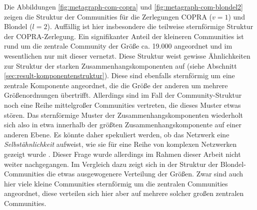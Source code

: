 Die Abbildungen \ref{fig:metagraph-com-copra} und
\ref{fig:metagraph-com-blondel2} zeigen die Struktur der Communities
für die Zerlegungen COPRA ($v=1$) und Blondel ($l=2$). Auffällig
ist hier insbesondere die teilweise sternförmige Struktur der
COPRA-Zerlegung. Ein signifikanter Anteil der kleineren Communities
ist rund um die zentrale Community der Größe ca. 19.000 angeordnet
und im wesentlichen nur mit dieser vernetzt. Diese Struktur weist
gewisse Ähnlichkeiten zur Struktur der starken
Zusammenhangskomponenten auf (siehe Abschnitt
\ref{sec:result-komponentenstruktur}). Diese sind ebenfalls
sternförmig um eine zentrale Komponente angeordnet, die die Größe
der anderen um mehrere Größenordnungen übertrifft. Allerdings
sind im Fall der Community-Struktur noch eine Reihe mittelgroßer
Communities vertreten, die dieses Muster etwas stören. Das
sternförmige Muster der Zusammenhangskomponenten wiederholt sich
also in etwa innerhalb der größten Zusammenhangskomponente auf
einer anderen Ebene. Es könnte daher spekuliert werden, ob das
Netzwerk eine \emph{Selbstähnlichkeit} aufweist, wie sie für eine
Reihe von komplexen Netzwerken gezeigt wurde \cite{Song2005}. Dieser
Frage wurde allerdings im Rahmen dieser Arbeit nicht weiter
nachgegangen. Im Vergleich dazu zeigt sich in der Struktur der
Blondel-Communities die etwas ausgewogenere Verteilung der Größen. Zwar
sind auch hier viele kleine Communities sternförmig um die zentralen
Communities angeordnet, diese verteilen sich hier aber auf mehrere solcher
großen zentralen Communities.

